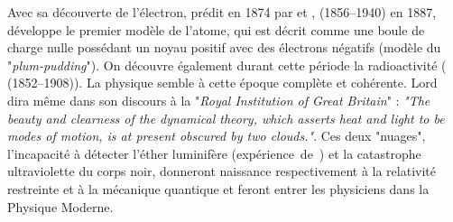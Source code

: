 Avec sa découverte de l'électron, prédit en \num{1874} par  et ,  (\num{1856}--\num{1940}) en \num{1887}, développe le premier modèle de l'atome, qui est décrit comme une boule de charge nulle possédant un noyau positif avec des électrons négatifs (modèle du "\textit{plum-pudding}"). On découvre également durant cette période la radioactivité ( \hbox{(\num{1852}--\num{1908}))}. La physique semble à cette époque complète et cohérente. Lord  dira même dans son discours à la "\textit{Royal Institution of Great Britain}" : \textit{"The beauty and clearness of the dynamical theory, which asserts heat and light to be modes of motion, is at present obscured by two clouds."}. Ces deux "nuages", l'incapacité à détecter l'éther luminifère  \hbox{(expérience de )} et la catastrophe ultraviolette du corps noir, donneront naissance respectivement à la relativité restreinte et à la mécanique quantique et feront entrer les physiciens dans la Physique Moderne.

